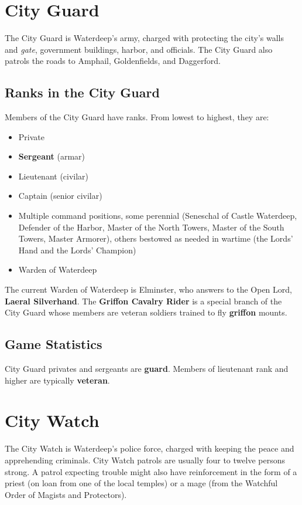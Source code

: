 \documentclass[10pt,a4paper,twoside,twocolumn,openany,nodeprecatedcode]{dndbook}
\begin{document}
\section{City Guard}
The City Guard is Waterdeep's army, charged with protecting the city's walls and \textit{gate}, government buildings, harbor, and officials. The City Guard also patrols the roads to Amphail, Goldenfields, and Daggerford.
\subsection{Ranks in the City Guard}
Members of the City Guard have ranks. From lowest to highest, they are:
\begin{itemize}

\item Private
\item \textbf{Sergeant} (armar)
\item Lieutenant (civilar)
\item Captain (senior civilar)
\item Multiple command positions, some perennial (Seneschal of Castle Waterdeep, Defender of the Harbor, Master of the North Towers, Master of the South Towers, Master Armorer), others bestowed as needed in wartime (the Lords' Hand and the Lords' Champion)
\item Warden of Waterdeep
\end{itemize}


The current Warden of Waterdeep is Elminster, who answers to the Open Lord, \textbf{Laeral Silverhand}.
The \textbf{Griffon Cavalry Rider} is a special branch of the City Guard whose members are veteran soldiers trained to fly \textbf{griffon} mounts.
\subsection{Game Statistics}
City Guard privates and sergeants are \textbf{guard}. Members of lieutenant rank and higher are typically \textbf{veteran}.
\section{City Watch}
The City Watch is Waterdeep's police force, charged with keeping the peace and apprehending criminals. City Watch patrols are usually four to twelve persons strong. A patrol expecting trouble might also have reinforcement in the form of a priest (on loan from one of the local temples) or a mage (from the Watchful Order of Magists and Protectors).
\end{document}
